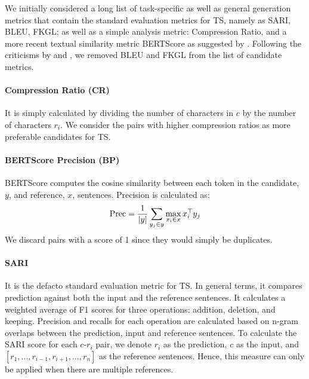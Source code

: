 \documentclass[11pt]{article}
\begin{document}
We initially considered a long list of task-specific as well as general generation metrics that contain the standard evaluation metrics for TS, namely as SARI, BLEU, FKGL; as well as a simple analysis metric: Compression Ratio, and a more recent textual similarity metric BERTScore as suggested by \citet{alva-manchego-etal-2021-un}. Following the criticisms by \citet{sulem-etal-2018-bleu} and \citet{tanprasert-kauchak-2021-flesch}, we removed BLEU and FKGL from the list of candidate metrics.

\paragraph{Compression Ratio (CR)} It is simply calculated by dividing the number of characters in $c$ by the number of characters $r_i$. We consider the pairs with higher compression ratios as more preferable candidates for TS.

\paragraph{BERTScore Precision (BP)~\citep{bertscore}} BERTScore computes the cosine similarity between each token in the candidate, $y$, and reference, $x$, sentences. Precision is calculated as:
\begin{equation}
 \textnormal{Prec} = \frac{1}{|y|} \sum_{y_j \in y} \max_{x_i \in x}  x_{i}^\top y_{j}  
\end{equation}
We discard pairs with a score of 1 since they would simply be duplicates.

\paragraph{SARI~\citep{xu-etal-2016-optimizing}} It is the defacto standard evaluation metric for TS. In general terms, it compares prediction against both the input and the reference sentences. It calculates a weighted average of F1 scores for three operations: addition, deletion, and keeping. Precision and recalls for each operation are calculated based on n-gram overlaps between the prediction, input and reference sentences. To calculate the SARI score for each $c$-$r_i$ pair, we denote $r_i$ as the prediction, $c$ as the input, and $[r_1,...,r_{i-1}, r_{i+1},..., r_n]$ as the reference sentences. Hence, this measure can only be applied when there are multiple references. 
\end{document}
